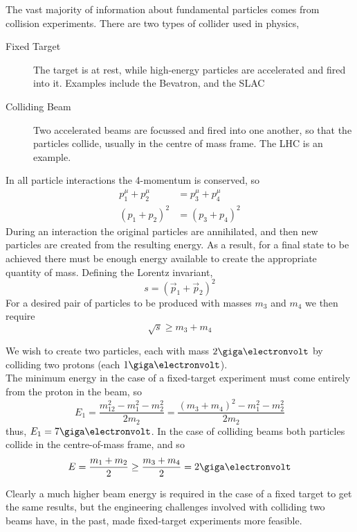 The vast majority of information about fundamental particles comes
from collision experiments. There are two types of collider used in physics,
\begin{description}
\item[Fixed Target] The target is at rest, while high-energy particles are accelerated and fired into it. Examples include the Bevatron, and the SLAC
\item[Colliding Beam] Two accelerated beams are focussed and fired
  into one another, so that the particles collide, usually in the
  centre of mass frame. The LHC is an example.
\end{description}
In all particle interactions the 4-momentum is conserved, so
\begin{align*} 
p^{\mu}_1 + p^{\mu}_2 &= p^{\mu}_3 + p^{\mu}_4 \\
(p_1 + p_2)^2 &= (p_3 + p_4)^2
\end{align*}
During an interaction the original particles are annihilated, and then
new particles are created from the resulting energy. As a result, for
a final state to be achieved there must be enough energy available to
create the appropriate quantity of mass. Defining the Lorentz invariant, 
\[ s = (\vec{p}_1 + \vec{p}_2)^2 \] For a desired pair of particles to
be produced with masses $m_3$ and $m_4$ we then require
\[ \sqrt{s} \ge m_3 + m_4 \]

\begin{example}
  We wish to create two particles, each with mass $2 \giga
  \electronvolt$ by colliding two protons (each $1 \giga
  \electronvolt$).\\
  The minimum energy in the case of a fixed-target experiment must
  come entirely from the proton in the beam, so
  \[ E_1 = \frac{m_{12}^2 - m_1^2 - m_2^2}{2 m_2} = \frac{(m_3+m_4)^2
    - m_1^2 - m_2^2}{2 m_2} \] thus, $E_1 = 7 \giga \electronvolt$.
  In the case of colliding beams both particles collide in the
  centre-of-mass frame, and so
  \[ E = \frac{m_1+m_2}{2} \ge \frac{m_3+m_4}{2} = 2 \giga
  \electronvolt \]
\end{example}
Clearly a much higher beam energy is required in the case of a fixed
target to get the same results, but the engineering challenges
involved with colliding two beams have, in the past, made fixed-target
experiments more feasible.


